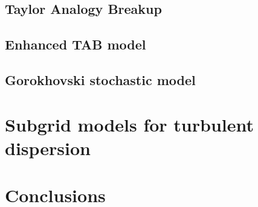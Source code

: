 \subsection{Taylor Analogy Breakup}



\subsection{Enhanced TAB model}


\subsection{Gorokhovski stochastic model}


\section{Subgrid models for turbulent dispersion}


\section{Conclusions}
